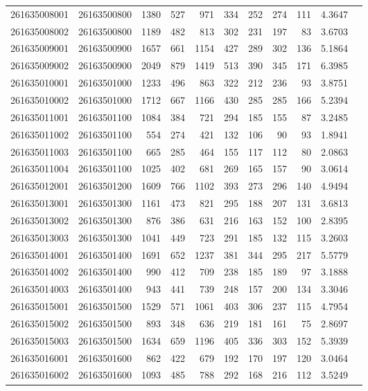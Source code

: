 \documentclass[11pt,landscape]{article}
\begin{document}
{\begin{longtable}[]{@{}lrrrrrrrrrr@{}}
261635008001 & 26163500800 & 1380 & 527 & 971 & 334 & 252 & 274 & 111 & 4.3647 \\
261635008002 & 26163500800 & 1189 & 482 & 813 & 302 & 231 & 197 & 83 & 3.6703 \\
261635009001 & 26163500900 & 1657 & 661 & 1154 & 427 & 289 & 302 & 136 & 5.1864 \\
261635009002 & 26163500900 & 2049 & 879 & 1419 & 513 & 390 & 345 & 171 & 6.3985 \\
261635010001 & 26163501000 & 1233 & 496 & 863 & 322 & 212 & 236 & 93 & 3.8751 \\
261635010002 & 26163501000 & 1712 & 667 & 1166 & 430 & 285 & 285 & 166 & 5.2394 \\
261635011001 & 26163501100 & 1084 & 384 & 721 & 294 & 185 & 155 & 87 & 3.2485 \\
261635011002 & 26163501100 & 554 & 274 & 421 & 132 & 106 & 90 & 93 & 1.8941 \\
261635011003 & 26163501100 & 665 & 285 & 464 & 155 & 117 & 112 & 80 & 2.0863 \\
261635011004 & 26163501100 & 1025 & 402 & 681 & 269 & 165 & 157 & 90 & 3.0614 \\
261635012001 & 26163501200 & 1609 & 766 & 1102 & 393 & 273 & 296 & 140 & 4.9494 \\
261635013001 & 26163501300 & 1161 & 473 & 821 & 295 & 188 & 207 & 131 & 3.6813 \\
261635013002 & 26163501300 & 876 & 386 & 631 & 216 & 163 & 152 & 100 & 2.8395 \\
261635013003 & 26163501300 & 1041 & 449 & 723 & 291 & 185 & 132 & 115 & 3.2603 \\
261635014001 & 26163501400 & 1691 & 652 & 1237 & 381 & 344 & 295 & 217 & 5.5779 \\
261635014002 & 26163501400 & 990 & 412 & 709 & 238 & 185 & 189 & 97 & 3.1888 \\
261635014003 & 26163501400 & 943 & 441 & 739 & 248 & 157 & 200 & 134 & 3.3046 \\
261635015001 & 26163501500 & 1529 & 571 & 1061 & 403 & 306 & 237 & 115 & 4.7954 \\
261635015002 & 26163501500 & 893 & 348 & 636 & 219 & 181 & 161 & 75 & 2.8697 \\
261635015003 & 26163501500 & 1634 & 659 & 1196 & 405 & 336 & 303 & 152 & 5.3939 \\
261635016001 & 26163501600 & 862 & 422 & 679 & 192 & 170 & 197 & 120 & 3.0464 \\
261635016002 & 26163501600 & 1093 & 485 & 788 & 292 & 168 & 216 & 112 & 3.5249 \\

\end{longtable}}
\end{document}
